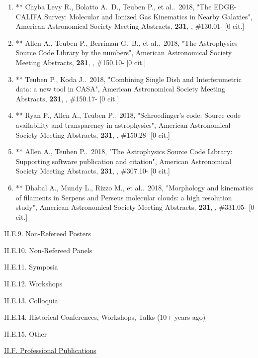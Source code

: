 \documentclass[11pt,letterpaper]{article}
\begin{document}
\begin{enumerate}[resume,label=\textbf{\arabic*}.]
\item     **
  Chyba Levy R., Bolatto A.~D., Teuben P., et al..\  2018,  "The 
EDGE-CALIFA Survey: Molecular and Ionized Gas Kinematics in Nearby 
Galaxies", American Astronomical Society Meeting Abstracts,  {\bf 231}, , 
\#130.01- [0 cit.] %

\item     **
  Allen A., Teuben P., Berriman G.~B., et al..\  2018,  "The 
Astrophysics Source Code Library by the numbers", American Astronomical 
Society Meeting Abstracts,  {\bf 231}, , \#150.10- [0 cit.] %

\item    **
  Teuben P., Koda J..\  2018,  "Combining Single Dish and 
Interferometric data: a new tool in CASA", American Astronomical Society 
Meeting Abstracts,  {\bf 231}, , \#150.17- [0 cit.] %

\item    **
  Ryan P., Allen A., Teuben P..\  2018,  "Schroedinger's code: 
Source code availability and transparency in astrophysics", American 
Astronomical Society Meeting Abstracts,  {\bf 231}, , \#150.28- [0 cit.] %

\item    **
  Allen A., Teuben P..\  2018,  "The Astrophysics Source Code Library: 
Supporting software publication and citation", American Astronomical 
Society Meeting Abstracts,  {\bf 231}, , \#307.10- [0 cit.] %

\item     **
  Dhabal A., Mundy L., Rizzo M., et al..\  2018,  "Morphology and 
kinematics of filaments in Serpens and Perseus molecular clouds: a high 
resolution study", American Astronomical Society Meeting Abstracts,  {\bf 
231}, , \#331.05- [0 cit.] %

\end{enumerate}

II.E.9. Non-Refereed Posters


II.E.10. Non-Refereed Panels

II.E.11. Symposia

II.E.12. Workshops

II.E.13. Colloquia

II.E.14. Historical Conferences, Workshops, Talks (10+ years ago)

II.E.15. Other


\underline{II.F. Professional Publications}
\end{document}
